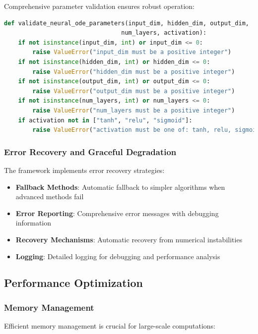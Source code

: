 Comprehensive parameter validation ensures robust operation:

\begin{lstlisting}[language=Python, caption=Parameter Validation Example]
def validate_neural_ode_parameters(input_dim, hidden_dim, output_dim, 
                                 num_layers, activation):
    if not isinstance(input_dim, int) or input_dim <= 0:
        raise ValueError("input_dim must be a positive integer")
    if not isinstance(hidden_dim, int) or hidden_dim <= 0:
        raise ValueError("hidden_dim must be a positive integer")
    if not isinstance(output_dim, int) or output_dim <= 0:
        raise ValueError("output_dim must be a positive integer")
    if not isinstance(num_layers, int) or num_layers <= 0:
        raise ValueError("num_layers must be a positive integer")
    if activation not in ["tanh", "relu", "sigmoid"]:
        raise ValueError("activation must be one of: tanh, relu, sigmoid")
\end{lstlisting}

\subsubsection{Error Recovery and Graceful Degradation}

The framework implements error recovery strategies:

\begin{itemize}
    \item \textbf{Fallback Methods}: Automatic fallback to simpler algorithms when advanced methods fail
    \item \textbf{Error Reporting}: Comprehensive error messages with debugging information
    \item \textbf{Recovery Mechanisms}: Automatic recovery from numerical instabilities
    \item \textbf{Logging}: Detailed logging for debugging and performance analysis
\end{itemize}

\subsection{Performance Optimization}

\subsubsection{Memory Management}

Efficient memory management is crucial for large-scale computations:

